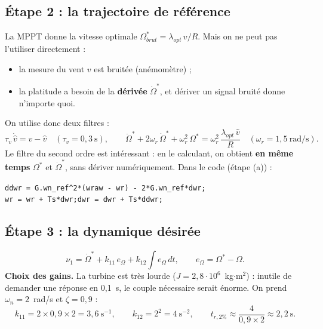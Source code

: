 \documentclass[11pt,a4paper]{article}
\begin{document}
\subsection{Étape 2 : la trajectoire de référence}
La MPPT donne la vitesse optimale $\Omega^*_{brut} = \lambda_{opt}\,v/R$. Mais on ne peut pas l'utiliser
directement :
\begin{itemize}
\item la mesure du vent $v$ est bruitée (anémomètre) ;
\item la platitude a besoin de la \textbf{dérivée} $\dot\Omega^*$, et dériver un signal bruité donne n'importe quoi.
\end{itemize}
On utilise donc deux filtres :
\begin{equation}
\tau_v\,\dot{\hat v} = v - \hat v \quad(\tau_v = 0{,}3~\text{s}),
\qquad
\ddot\Omega^* + 2\omega_r\,\dot\Omega^* + \omega_r^2\,\Omega^* = \omega_r^2\,\frac{\lambda_{opt}\,\hat v}{R}
\quad(\omega_r = 1{,}5~\text{rad/s}).
\end{equation}
Le filtre du second ordre est intéressant : en le calculant, on obtient \textbf{en même temps} $\Omega^*$ et
$\dot\Omega^*$, sans dériver numériquement. Dans le code (étape (a)) :
\begin{center}
\texttt{ddwr = G.wn\_ref\^{}2*(wraw - wr) - 2*G.wn\_ref*dwr;}\\ \texttt{wr = wr + Ts*dwr;\quad dwr = dwr + Ts*ddwr;}
\end{center}

\subsection{Étape 3 : la dynamique désirée}
\begin{equation}
\nu_1 = \dot\Omega^* + k_{11}\,e_\Omega + k_{12}\!\int\! e_\Omega\,dt, \qquad e_\Omega = \Omega^* - \Omega .
\end{equation}
\textbf{Choix des gains.} La turbine est très lourde ($J = 2{,}8\cdot10^6$~kg$\cdot$m$^2$) : inutile de
demander une réponse en 0,1~s, le couple nécessaire serait énorme. On prend $\omega_n = 2$~rad/s et
$\zeta = 0{,}9$ :
\begin{equation}
k_{11} = 2\times0{,}9\times2 = 3{,}6~\text{s}^{-1}, \qquad k_{12} = 2^2 = 4~\text{s}^{-2},
\qquad t_{r,2\%}\approx \frac{4}{0{,}9\times 2} \approx 2{,}2~\text{s}.
\end{equation}
\end{document}
